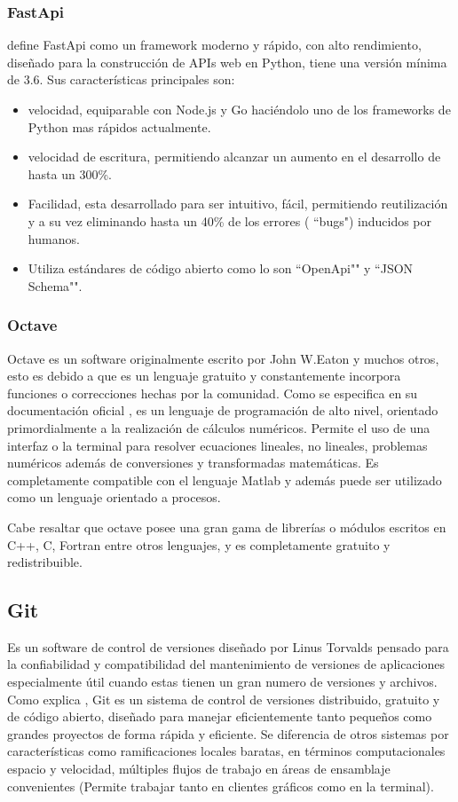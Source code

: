 \subsubsection{FastApi}
\cite{FastApi} define FastApi como un framework moderno y rápido, con alto
rendimiento, diseñado para
la construcción de APIs web en Python, tiene una versión mínima de 3.6. Sus
características principales son:

\begin{itemize}
    \item velocidad, equiparable con Node.js y Go haciéndolo
uno de los frameworks de Python mas rápidos actualmente.
    \item velocidad de escritura, permitiendo alcanzar un aumento en el desarrollo
        de hasta un 300\%.
    \item Facilidad, esta desarrollado para ser intuitivo, fácil, permitiendo
        reutilización y a su vez eliminando hasta un 40\% de los errores ( ``bugs")
        inducidos por humanos.
    \item Utiliza estándares de código abierto como lo son ``OpenApi"" y ``JSON Schema"".
\end{itemize}

\subsubsection{Octave}
Octave es un software originalmente escrito por John W.Eaton y muchos otros,
esto es debido a que es un lenguaje gratuito y constantemente incorpora
funciones o correcciones hechas por la comunidad. Como se especifica en su
documentación oficial \cite{octave}, es un lenguaje de programación de alto
nivel, orientado primordialmente a la realización de cálculos numéricos.
Permite el uso de una interfaz  o la terminal para resolver ecuaciones
lineales, no lineales, problemas numéricos además de conversiones y
transformadas matemáticas. Es completamente compatible con el lenguaje Matlab y
además puede ser utilizado como un lenguaje orientado a procesos.

Cabe resaltar que octave posee una gran gama de librerías o módulos escritos en
C++, C, Fortran entre otros lenguajes, y es completamente gratuito y
redistribuible.


\subsection{Git}
Es un software de control de versiones diseñado por Linus Torvalds pensado para
la confiabilidad y compatibilidad del mantenimiento de versiones de aplicaciones
especialmente útil cuando estas tienen un gran numero de versiones y archivos.
Como explica \cite{Git}, Git es un sistema de control de versiones distribuido,
gratuito y de código abierto, diseñado para manejar eficientemente tanto pequeños
como grandes proyectos de forma rápida y eficiente. Se diferencia de otros sistemas
por características como ramificaciones locales baratas, en términos computacionales
espacio y velocidad, múltiples flujos de trabajo en áreas de ensamblaje convenientes
(Permite trabajar tanto en clientes gráficos como en la terminal).

